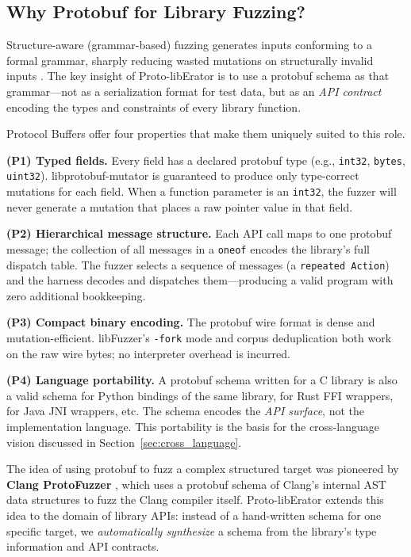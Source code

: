 \documentclass[sigconf,anonymous]{acmart}
\begin{document}
\subsection{Why Protobuf for Library Fuzzing?}
\label{sec:why_proto}

Structure-aware (grammar-based) fuzzing generates inputs conforming to a
formal grammar, sharply reducing wasted mutations on structurally invalid
inputs \cite{libfuzzer,afl_whitepaper,peach_fuzzer}.  The key insight
of Proto-libErator is to use a protobuf schema as that grammar---not as
a serialization format for test data, but as an \emph{API contract}
encoding the types and constraints of every library function.

Protocol Buffers offer four properties that make them uniquely suited
to this role.

\textbf{(P1) Typed fields.}  Every field has a declared protobuf type
(e.g., \texttt{int32}, \texttt{bytes}, \texttt{uint32}).
libprotobuf-mutator \cite{libprotobuf_mutator} is guaranteed to produce
only type-correct mutations for each field.  When a function parameter
is an \texttt{int32}, the fuzzer will never generate a mutation that
places a raw pointer value in that field.

\textbf{(P2) Hierarchical message structure.}  Each API call maps to
one protobuf message; the collection of all messages in a \texttt{oneof}
encodes the library's full dispatch table.  The fuzzer selects a sequence
of messages (a \texttt{repeated Action}) and the harness decodes and
dispatches them---producing a valid program with zero additional bookkeeping.

\textbf{(P3) Compact binary encoding.}  The protobuf wire format is
dense and mutation-efficient.  libFuzzer's \texttt{-fork} mode and
corpus deduplication both work on the raw wire bytes; no interpreter
overhead is incurred.

\textbf{(P4) Language portability.}  A protobuf schema written for a
C library is also a valid schema for Python bindings of the same library,
for Rust FFI wrappers, for Java JNI wrappers, etc.  The schema encodes
the \emph{API surface}, not the implementation language.  This
portability is the basis for the cross-language vision
discussed in Section~\ref{sec:cross_language}.

The idea of using protobuf to fuzz a complex structured target was
pioneered by \textbf{Clang ProtoFuzzer} \cite{clang_proto_fuzzer}, which
uses a protobuf schema of Clang's internal AST data structures to fuzz
the Clang compiler itself.  Proto-libErator extends this idea to the
domain of library APIs: instead of a hand-written schema for one
specific target, we \emph{automatically synthesize} a schema from the
library's type information and API contracts.
\end{document}
